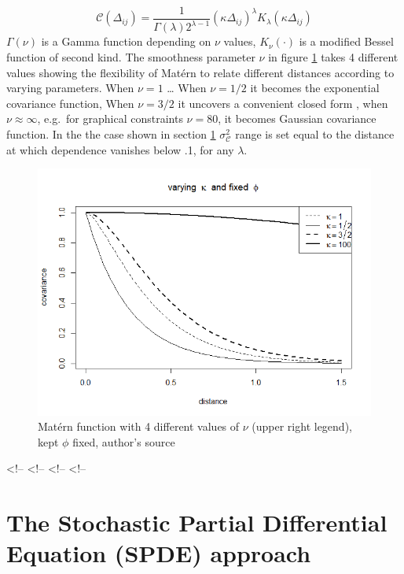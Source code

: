 \documentclass[
  12pt,
  a4paper,
  oneside]{book}
\theoremstyle{definition}
\theoremstyle{definition}
\theoremstyle{definition}
\theoremstyle{remark}
\begin{document}
\[
\mathscr{C}\left(\Delta_{i j}\right)=\frac{1}{\Gamma(\lambda) 2^{\lambda-1}}\left(\kappa \Delta_{i j}\right)^{\lambda} K_{\lambda}\left(\kappa \Delta_{i j}\right)
\]
\(\Gamma(\nu)\) is a Gamma function depending on \(\nu\) values, \(K_{\nu}(\cdot)\) is a modified Bessel function of second kind. The smoothness parameter \(\nu\) in figure \ref{fig:matern} takes 4 different values showing the flexibility of Matérn to relate different distances according to varying parameters. When \(\nu = 1\) \ldots{} When \(\nu = 1/2\) it becomes the exponential covariance function, When \(\nu = 3/2\) it uncovers a convenient closed form \citep{LecturePaci}, when \(\nu \approx \infty\), e.g.~for graphical constraints \(\nu = 80\), it becomes Gaussian covariance function. In the the case shown in section \ref{spdeapproach} \(\sigma_{\mathscr{C}}^{2}\) range is set equal to the distance at which dependence vanishes below .1, for any \(\lambda\).

\begin{figure}
\centering
\includegraphics{images/matern.png}
\caption{\label{fig:matern}Matérn function with 4 different values of \(\nu\) (upper right legend), kept \(\phi\) fixed, author's source}
\end{figure}

\textless!--
\textless!--
\textless!--
\textless!--

\hypertarget{spdeapproach}{%
\section{The Stochastic Partial Differential Equation (SPDE) approach}\label{spdeapproach}}
\end{document}
